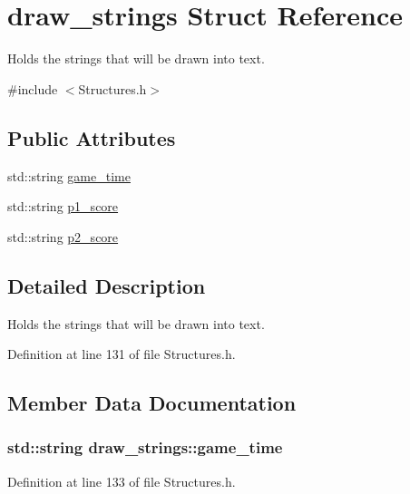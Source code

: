\hypertarget{structdraw__strings}{\section{draw\-\_\-strings Struct Reference}
\label{structdraw__strings}
}


Holds the strings that will be drawn into text.  




{\ttfamily \#include $<$Structures.\-h$>$}

\subsection*{Public Attributes}
\begin{DoxyCompactItemize}
\item 
std\-::string \hyperlink{structdraw__strings_a4d19f66b000d19861c475694328d9fce}{game\-\_\-time}
\item 
std\-::string \hyperlink{structdraw__strings_a0d59a0f9e78f1c539dbe7959dcd9c3bb}{p1\-\_\-score}
\item 
std\-::string \hyperlink{structdraw__strings_a749fa74ab7403f436f100c546b073be8}{p2\-\_\-score}
\end{DoxyCompactItemize}


\subsection{Detailed Description}
Holds the strings that will be drawn into text. 

Definition at line 131 of file Structures.\-h.



\subsection{Member Data Documentation}
\hypertarget{structdraw__strings_a4d19f66b000d19861c475694328d9fce}{
\subsubsection[{game\-\_\-time}]{\setlength{\rightskip}{0pt plus 5cm}std\-::string draw\-\_\-strings\-::game\-\_\-time}}\label{structdraw__strings_a4d19f66b000d19861c475694328d9fce}


Definition at line 133 of file Structures.\-h.




